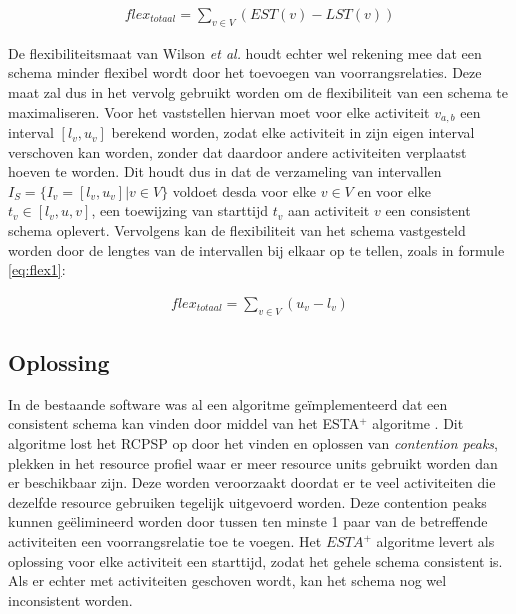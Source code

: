 \begin{align}
\label{eq:flexSlecht}
    flex_{totaal} = \sum_{v \in V} (EST(v) - LST(v))
\end{align}

De flexibiliteitsmaat van Wilson \emph{et al.} \cite{wilson2013flexibility} houdt echter wel rekening mee dat een schema minder flexibel wordt door het toevoegen van voorrangsrelaties. Deze maat zal dus in het vervolg gebruikt worden om de flexibiliteit van een schema te maximaliseren. Voor het vaststellen hiervan moet voor elke activiteit $v_{a,b}$ een interval $[l_v,u_v]$ berekend worden, zodat elke activiteit in zijn eigen interval verschoven kan worden, zonder dat daardoor andere activiteiten verplaatst hoeven te worden. Dit houdt dus in dat de verzameling van intervallen $I_S = \{I_v = [l_v,u_v] | v \in V\}$ voldoet desda voor elke $v \in V$ en voor elke $t_v \in [l_v,u,v]$, een toewijzing van starttijd $t_v$ aan activiteit $v$ een consistent schema oplevert. Vervolgens kan de flexibiliteit van het schema vastgesteld worden door de lengtes van de intervallen bij elkaar op te tellen, zoals in formule \ref{eq:flex1}:

\begin{align}
\label{eq:flex1}
    flex_{totaal} = \sum_{v \in V} (u_v - l_v)
\end{align}

\subsection{Oplossing}
\label{subsec:probleemoplossing}
In de bestaande software was al een algoritme ge\"implementeerd dat een consistent schema kan vinden door middel van het ESTA$^+$ algoritme \cite{ronaldevers2010}.
Dit algoritme lost het RCPSP op door het vinden en oplossen van \emph{contention peaks}, plekken in het resource profiel waar er meer resource units gebruikt worden dan er beschikbaar zijn. Deze worden veroorzaakt doordat er te veel activiteiten die dezelfde resource gebruiken tegelijk uitgevoerd worden. Deze contention peaks kunnen ge\"elimineerd worden door tussen ten minste 1 paar van de betreffende activiteiten een voorrangsrelatie toe te voegen. Het $ESTA^+$ algoritme levert als oplossing voor elke activiteit een starttijd, zodat het gehele schema consistent is. Als er echter met activiteiten geschoven wordt, kan het schema nog wel inconsistent worden.

